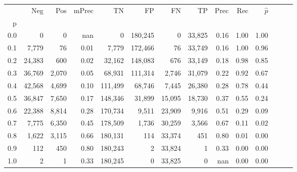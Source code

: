 \begin{tabular}{rrrrrrrrrrrrrr}
\toprule
{} &     Neg &    Pos & mPrec &       TN &       FP &      FN &      TP &  Prec &   Rec & $\hat{p}$ \\
p   &         &        &       &          &          &         &         &       &       &           \\
\midrule
0.0 &       0 &      0 &   nan &        0 &  180,245 &       0 &  33,825 &  0.16 &  1.00 &      1.00 \\
0.1 &   7,779 &     76 &  0.01 &    7,779 &  172,466 &      76 &  33,749 &  0.16 &  1.00 &      0.96 \\
0.2 &  24,383 &    600 &  0.02 &   32,162 &  148,083 &     676 &  33,149 &  0.18 &  0.98 &      0.85 \\
0.3 &  36,769 &  2,070 &  0.05 &   68,931 &  111,314 &   2,746 &  31,079 &  0.22 &  0.92 &      0.67 \\
0.4 &  42,568 &  4,699 &  0.10 &  111,499 &   68,746 &   7,445 &  26,380 &  0.28 &  0.78 &      0.44 \\
0.5 &  36,847 &  7,650 &  0.17 &  148,346 &   31,899 &  15,095 &  18,730 &  0.37 &  0.55 &      0.24 \\
0.6 &  22,388 &  8,814 &  0.28 &  170,734 &    9,511 &  23,909 &   9,916 &  0.51 &  0.29 &      0.09 \\
0.7 &   7,775 &  6,350 &  0.45 &  178,509 &    1,736 &  30,259 &   3,566 &  0.67 &  0.11 &      0.02 \\
0.8 &   1,622 &  3,115 &  0.66 &  180,131 &      114 &  33,374 &     451 &  0.80 &  0.01 &      0.00 \\
0.9 &     112 &    450 &  0.80 &  180,243 &        2 &  33,824 &       1 &  0.33 &  0.00 &      0.00 \\
1.0 &       2 &      1 &  0.33 &  180,245 &        0 &  33,825 &       0 &   nan &  0.00 &      0.00 \\
\bottomrule
\end{tabular}
